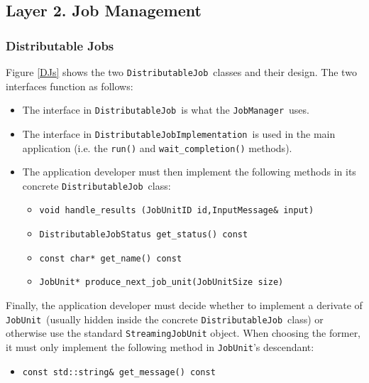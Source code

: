 \documentclass[a4paper,12pt,english]{report}
\renewcommand{\DJ}{\texttt{DistributableJob}}
\newcommand{\DJI}{\texttt{DistributableJobImplementation}}
\newcommand{\JU}{\texttt{JobUnit}}
\newcommand{\JM}{\texttt{JobManager}}
\begin{document}
\subsection{Layer 2. Job Management}

\subsubsection{Distributable Jobs}

Figure \ref{DJs} shows the two \DJ \ classes and their design. The two interfaces function as follows:
\begin{itemize}
\item The interface in \DJ \ is what the \JM \ uses. 
\item The interface in \DJI \ is used in the main application (i.e. the \texttt{run()} and \texttt{wait\_completion()} methods).
\item The application developer must then implement the following methods in its concrete \DJ \ class:
\begin{scriptsize}
\begin{itemize}
\item { \texttt{void handle\_results (JobUnitID id,InputMessage\& input)}}
\item { \texttt{DistributableJobStatus get\_status()    const}} 
\item { \texttt{const char*            get\_name()      const}} 
\item { \texttt{JobUnit*    produce\_next\_job\_unit(JobUnitSize size)}} 
\end{itemize}
\end{scriptsize}
\end{itemize}

Finally, the application developer must decide whether to implement a derivate of \JU \ (usually hidden inside the concrete \DJ \ class) or otherwise use the standard \texttt{StreamingJobUnit} object. When choosing the former, it must only implement the following method in \JU 's descendant:
\begin{scriptsize}
\begin{itemize}
\item { \texttt{const std::string\& get\_message() const} }
\end{itemize}
\end{scriptsize}
\end{document}
